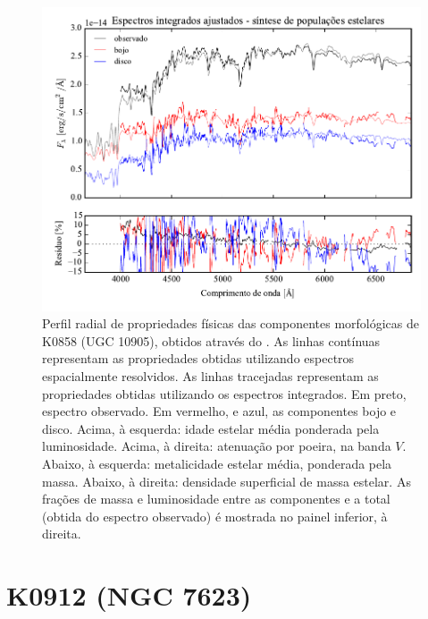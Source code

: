 \begin{figure}
	\includegraphics[page=16]{figuras/sample006a_synthesis}
	\caption[Propriedades físicas das componentes morfológicas de K0858 (UGC 10905)]
	{Perfil radial de propriedades físicas das componentes morfológicas de
	K0858 (UGC 10905), obtidos através do \starlight. As linhas contínuas
	representam as propriedades obtidas utilizando espectros espacialmente
	resolvidos. As linhas tracejadas representam as propriedades obtidas utilizando
	os espectros integrados. Em preto, espectro observado. Em vermelho, e azul, as
	componentes bojo e disco. Acima, à esquerda: idade estelar média ponderada pela
	luminosidade. Acima, à direita: atenuação por poeira, na banda $V$. Abaixo, à
	esquerda: metalicidade estelar média, ponderada pela massa. Abaixo, à direita:
	densidade superficial de massa estelar. As frações de massa e luminosidade
	entre as componentes e a total (obtida do espectro observado) é mostrada no
	painel inferior, à direita.}
	\label{fig:decompSinteseRadprof:K0858}
\end{figure}


\section{K0912 (NGC 7623)}
\label{apendice:Decomp:K0912}

